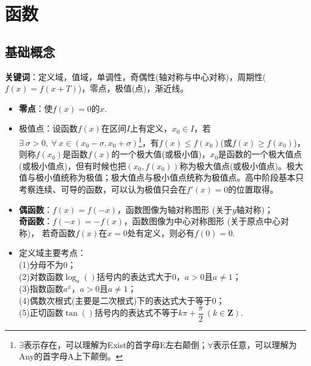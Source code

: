 \chapter{函数}

\section{基础概念}
\noindent \textbf{关键词}：定义域，值域，单调性，奇偶性(轴对称与中心对称)，周期性($ f(x)=f(x+T) $)，零点，极值(点)，渐近线。 

\begin{itemize}[leftmargin=\inteval{\myitemleftmargin}pt,itemsep=
   \inteval{\myitemitempsep}pt,topsep=\inteval{\myitemtopsep}pt]
\item \textbf{零点}：使$ f(x)=0 $的$ x $. 
\item 极值点：设函数$ f(x) $在区间$ I $上有定义，$ x_0\in I $，若$ \exists\ \sigma>0,\ \forall\ x\in(x_0-\sigma,x_0+\sigma) $\footnote{$ \exists $表示存在，可以理解为Exist的首字母E左右颠倒；$ \forall $表示任意，可以理解为Any的首字母A上下颠倒。}，有$ f(x)\leq f(x_0) $(或$ f(x)\geq f(x_0) $)，则称$ f(x_0) $是函数$ f(x) $的一个极大值(或极小值)，$ x_0 $是函数的一个极大值点(或极小值点)，但有时候也把$ (x_0,f(x_0)) $称为极大值点(或极小值点)。极大值与极小值统称为极值；极大值点与极小值点统称为极值点。高中阶段基本只考察连续、可导的函数，可以认为极值只会在$ f'(x)=0 $的位置取得。

\item \textbf{偶函数}：$ f(x)=f(-x) $，函数图像为轴对称图形
(关于$y$轴对称)；\\
\textbf{奇函数}：$ f(-x)=-f(x) $，函数图像为中心对称图形
(关于原点中心对称)，
若奇函数$ f(x) $在$ x=0 $处有定义，则必有$ f(0)=0 $.

\item 定义域主要考点：\\
(1)分母不为0；\\
(2)对数函数$ \log_a() $括号内的表达式大于0，$a>0$且$ a\neq 1 $；\\
(3)指数函数$a^x$，$a>0$且$ a\neq 1 $；\\
(4)偶数次根式(主要是二次根式)下的表达式大于等于0；\\
(5)正切函数$ \tan() $括号内的表达式不等于$ k\pi+\dfrac{\pi}{2}\ 
(k\in \mathbf{Z}) $. 


\end{itemize}
